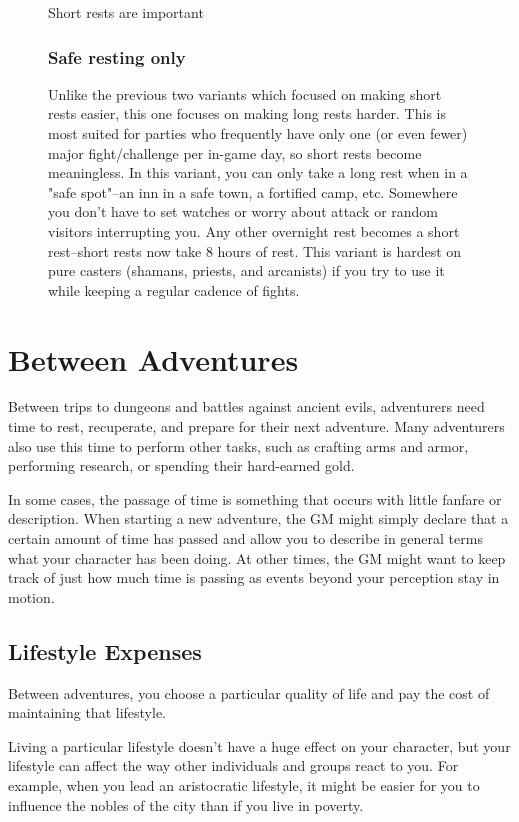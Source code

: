\begin{figure}
\begin{DndSidebar}{Short rests are important}
        \subsubsection{Safe resting only}
        Unlike the previous two variants which focused on making short rests easier, this one focuses on making long rests harder. This is most suited for parties who frequently have only one (or even fewer) major fight/challenge per in-game day, so short rests become meaningless. In this variant, you can only take a long rest when in a "safe spot"--an inn in a safe town, a fortified camp, etc. Somewhere you don't have to set watches or worry about attack or random visitors interrupting you. Any other overnight rest becomes a short rest--short rests now take 8 hours of rest. This variant is hardest on pure casters (shamans, priests, and arcanists) if you try to use it while keeping a regular cadence of fights.
    \end{DndSidebar}
\end{figure}


\section{Between Adventures}

Between trips to dungeons and battles against ancient evils, adventurers need time to rest, recuperate, and prepare for their next adventure. Many adventurers also use this time to perform other tasks, such as crafting arms and armor, performing research, or spending their hard-earned gold.

In some cases, the passage of time is something that occurs with little fanfare or description. When starting a new adventure, the GM might simply declare that a certain amount of time has passed and allow you to describe in general terms what your character has been doing. At other times, the GM might want to keep track of just how much time is passing as events beyond your perception stay in motion.

\subsection{Lifestyle Expenses}

Between adventures, you choose a particular quality of life and pay the cost of maintaining that lifestyle.

Living a particular lifestyle doesn't have a huge effect on your character, but your lifestyle can affect the way other individuals and groups react to you. For example, when you lead an aristocratic lifestyle, it might be easier for you to influence the nobles of the city than if you live in poverty.

